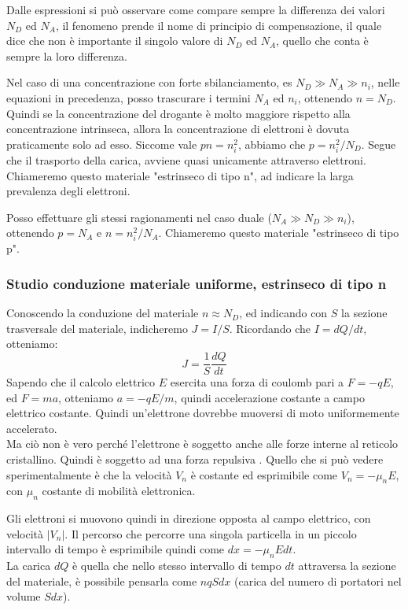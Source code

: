 \documentclass[../template]{subfiles}
\begin{document}
Dalle espressioni si può osservare come compare sempre la differenza dei valori $N_D$ ed $N_A$, il fenomeno prende il nome di principio di compensazione, il quale dice che non è importante il singolo valore di $N_D$ ed $N_A$, quello che conta è sempre la loro differenza.


Nel caso di una concentrazione con forte sbilanciamento, es $N_D \gg N_A \gg n_i$, nelle equazioni in precedenza, posso trascurare i termini $N_A$ ed $n_i$, ottenendo $n = N_D$.
Quindi se la concentrazione del drogante è molto maggiore rispetto alla concentrazione intrinseca, allora la concentrazione di elettroni è dovuta praticamente solo ad esso.
Siccome vale $pn = n_i^2$, abbiamo che $p = n_i^2 / N_D$. Segue che il trasporto della carica, avviene quasi unicamente attraverso elettroni.
\\
Chiameremo questo materiale "estrinseco di tipo n", ad indicare la larga prevalenza degli elettroni.

Posso effettuare gli stessi ragionamenti nel caso duale ($N_A \gg N_D \gg n_i$), ottenendo $p = N_A$ e $n = n_i^2 / N_A$.
Chiameremo questo materiale "estrinseco di tipo p".

\subsubsection{Studio conduzione materiale uniforme, estrinseco di tipo n}

Conoscendo la conduzione del materiale $n \approx N_D$, ed indicando con $S$ la sezione trasversale del materiale, indicheremo $J = I/S$.
Ricordando che $I = dQ/dt$, otteniamo:
\[
    J = \frac{1}{S}\frac{dQ}{dt}
\]
Sapendo che il calcolo elettrico $E$ esercita una forza di coulomb pari a $F = -qE$, ed $F = ma$, otteniamo $a = -qE/m$, quindi accelerazione costante a campo elettrico costante. Quindi un'elettrone dovrebbe muoversi di moto uniformemente accelerato.
\\
Ma ciò non è vero perché l'elettrone è soggetto anche alle forze interne al reticolo cristallino. Quindi è soggetto ad una forza repulsiva . Quello che si può vedere sperimentalmente è che la velocità $V_n$ è costante ed esprimibile come $V_n = -\mu_n E$, con $\mu_n$ costante di mobilità elettronica.

Gli elettroni si muovono quindi in direzione opposta al campo elettrico, con velocità $|V_n|$.
Il percorso che percorre una singola particella in un piccolo intervallo di tempo è esprimibile quindi come $dx = -\mu_n E dt$.
\\
La carica $dQ$ è quella che nello stesso intervallo di tempo $dt$ attraversa la sezione del materiale, è possibile pensarla come $nq S dx$ (carica del numero di portatori nel volume $Sdx$).
\end{document}
